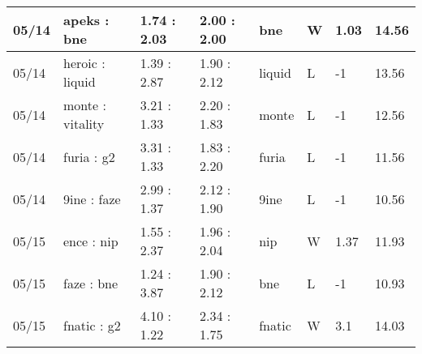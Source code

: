 \begin{small}
\begin{longtable}{|l|l|l|l|l|l|l|l|}
	05/14                               & apeks : bne                         & 1.74 : 2.03                             & 2.00 : 2.00                             & bne                               & W                                 & 1.03                                 & 14.56                             \\ \hline
	05/14                               & heroic : liquid                     & 1.39 : 2.87                             & 1.90 : 2.12                             & liquid                            & L                                 & -1                                   & 13.56                             \\ \hline
	05/14                               & monte : vitality                    & 3.21 : 1.33                             & 2.20 : 1.83                             & monte                             & L                                 & -1                                   & 12.56                             \\ \hline
	05/14                               & furia : g2                          & 3.31 : 1.33                             & 1.83 : 2.20                             & furia                             & L                                 & -1                                   & 11.56                             \\ \hline
	05/14                               & 9ine : faze                         & 2.99 : 1.37                             & 2.12 : 1.90                             & 9ine                              & L                                 & -1                                   & 10.56                             \\ \hline
	05/15                               & ence : nip                          & 1.55 : 2.37                             & 1.96 : 2.04                             & nip                               & W                                 & 1.37                                 & 11.93                             \\ \hline
	05/15                               & faze : bne                          & 1.24 : 3.87                             & 1.90 : 2.12                             & bne                               & L                                 & -1                                   & 10.93                             \\ \hline
	05/15                               & fnatic : g2                         & 4.10 : 1.22                             & 2.34 : 1.75                             & fnatic                            & W                                 & 3.1                                  & 14.03                             \\ \hline

\end{longtable}
\end{small}
